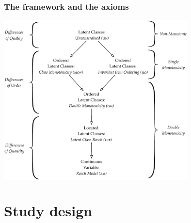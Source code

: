 \documentclass[10pt,serif,professionalfont]{beamer}
\begin{document}
\begin{frame}

    \frametitle{The framework and the axioms}

        \centering \includegraphics[width=0.75\textwidth]{./figs/Structure3.pdf} \\

\end{frame}


\section{Study design}
\end{document}
